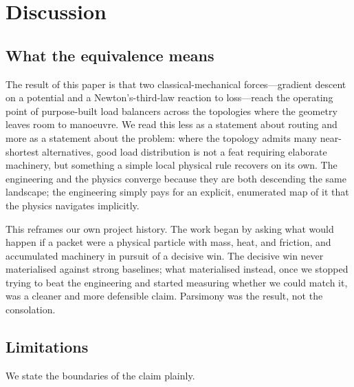 \section{Discussion}
\label{sec:discussion}

\subsection{What the equivalence means}

The result of this paper is that two classical-mechanical forces---gradient
descent on a potential and a Newton's-third-law reaction to loss---reach the
operating point of purpose-built load balancers across the topologies where the
geometry leaves room to manoeuvre. We read this less as a statement about
routing and more as a statement about the problem: where the topology admits
many near-shortest alternatives, good load distribution is not a feat requiring
elaborate machinery, but something a simple local physical rule recovers on its
own. The engineering and the physics converge because they are both descending
the same landscape; the engineering simply pays for an explicit, enumerated map
of it that the physics navigates implicitly.

This reframes our own project history. The work began by asking what would
happen if a packet were a physical particle with mass, heat, and friction, and
accumulated machinery in pursuit of a decisive win. The decisive win never
materialised against strong baselines; what materialised instead, once we
stopped trying to beat the engineering and started measuring whether we could
match it, was a cleaner and more defensible claim. Parsimony was the result, not
the consolation.

\subsection{Limitations}

We state the boundaries of the claim plainly.

